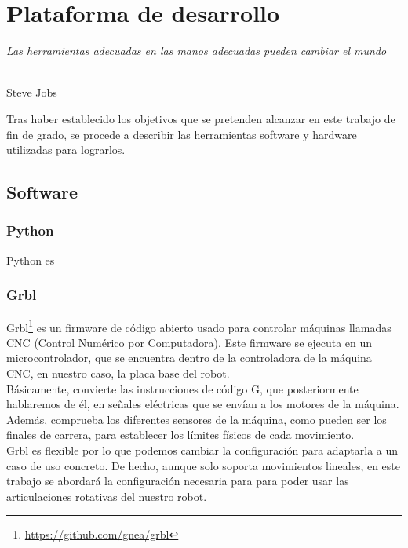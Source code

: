 \chapter{Plataforma de desarrollo}
\label{cap:capitulo4}

\begin{flushright}
\begin{minipage}[]{10cm}
\emph{Las herramientas adecuadas en las manos adecuadas pueden cambiar el mundo}\\
\end{minipage}\\
Steve Jobs\\
\end{flushright}

\vspace{1cm}
Tras haber establecido los objetivos que se pretenden alcanzar en este trabajo de fin de grado, se procede a describir
las herramientas software y hardware utilizadas para lograrlos. 

\section{Software}
\label{sec:software}

\subsection{Python}
\label{sec:pyhton}
Python es

\subsection{Grbl}
\label{sec:grbl}
Grbl\footnote{\url{https://github.com/gnea/grbl}} es un firmware de código abierto usado para controlar máquinas llamadas CNC (Control Numérico por Computadora). Este firmware se ejecuta en 
un microcontrolador, que se encuentra dentro de la controladora de la máquina CNC, en nuestro caso, la placa base del robot. \\
Básicamente, convierte las instrucciones de código G, que posteriormente hablaremos de él, en señales eléctricas que se envían a los motores de la máquina. Además, 
comprueba los diferentes sensores de la máquina, como pueden ser los finales de carrera, para establecer los límites físicos de cada movimiento. \\
Grbl es flexible por lo que podemos cambiar la configuración para adaptarla a un caso de uso concreto. De hecho, aunque solo soporta movimientos lineales,
en este trabajo se abordará la configuración necesaria para para poder usar las articulaciones rotativas del nuestro robot.

